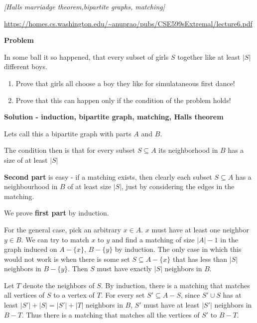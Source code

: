 \begin{problem}

\textit{[Halls marriadge theorem,bipartite graphs, matching]}

\url{https://homes.cs.washington.edu/~anuprao/pubs/CSE599sExtremal/lecture6.pdf}

\textbf{Problem}

In some ball it so happened, that every subset of girls $S$ together like at least  $|S|$ different boys.
\begin {enumerate}
\item Prove that girls all choose a boy they like for simulataneous first dance!

\item Prove that this can happen only if the condition of the problem holds!
\end {enumerate}

\textbf{Solution - induction, bipartite graph, matching, Halls theorem}

Lets call this a bipartite graph with parts $A$ and $B$.

The condition then is that for every subset $S \subseteq A$ its neighborhood in $B$ has a size of at least $|S|$

\textbf{Second part} is easy - if a matching exists, then clearly each subset $S \subseteq A$ has a neighbourhood in $B$ of at least size $|S|$, just by considering the edges in the matching.

We prove \textbf{first part} by induction.

For the general case, pick an arbitrary $x \in A$. $x$ must have at least one neighbor $y \in  B$. We can
try to match $x$ to $y$ and find a matching of size $|A| − 1$ in the graph induced on $A − \{x\}$, $B − \{y\}$
by induction. The only case in which this would not work is when there is some set $S \subseteq A − \{x\}$
that has less than $|S|$ neighbors in $B − \{y\}$. Then $S$ must have exactly $|S|$ neighbors in $B$.

Let $T$ denote the neighbors of $S$. By induction, there is a matching that matches all vertices of
$S$ to a vertex of $T$. For every set $S' \subseteq A−S$, since $S' \cup S$ has at least $|S'|+|S| = |S'|+|T|$ neighbors in $B$, $S'$ must have at least $|S'|$ neighbors in $B − T$. Thus there is a matching that matches all the
vertices of $S'$
to $B − T$.

\end{problem}



